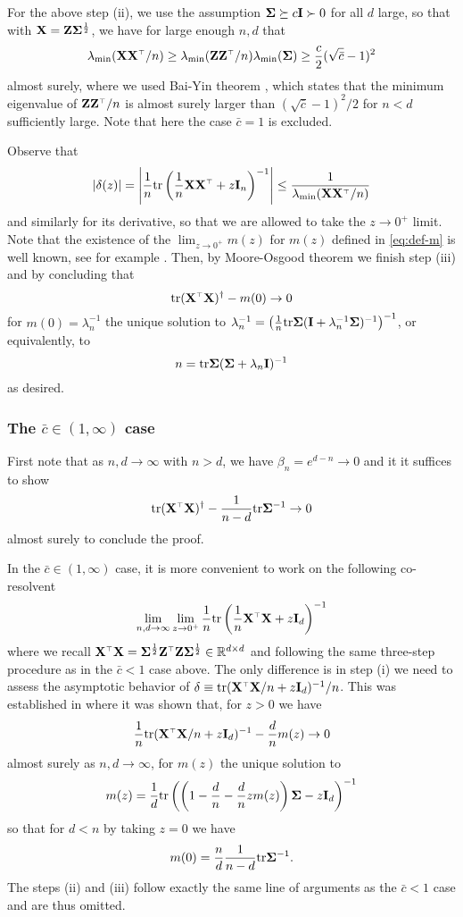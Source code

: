 For the above step (ii), we use the assumption $\mathbf{\Sigma} \succeq c \mathbf I \succ 0$
for all $d$ large, so that with $\mathbf X = \mathbf Z \mathbf{\Sigma}^{\frac12}$, we have for large enough $n,d$ that
\[
  \lambda_{\min} (\X \X^\top/n) \ge \lambda_{\min} (\Z \Z^\top/n) \lambda_{\min} (\Sigmab) \ge \frac{c}2 (\sqrt{\bar c} - 1 )^2
\]
almost surely, where we used Bai-Yin theorem \cite{bai1993limit}, which states that the minimum eigenvalue of $\Z \Z^\top/n$ is almost surely larger than $( \sqrt{\bar c} - 1 )^2/2$ for $n<d$ sufficiently large. Note that here the case $\bar c = 1$ is excluded.

Observe that
\[
  |\delta(z)| = \left| \frac1n \tr \left( \frac1n \X \X^\top  + z \I_n \right)^{-1} \right| \le \frac1{ \lambda_{\min} (\X \X^\top/n) }
\]
and similarly for its derivative, so that we are allowed to take the $z \to 0^+$ limit. Note that the existence of the $\lim_{z \to 0^+} m(z)$ for $m(z)$ defined in \eqref{eq:def-m} is well known, see for example \cite{ledoit2011eigenvectors}. Then, by Moore-Osgood theorem we finish step (iii) and by concluding that
\[
  \tr (\X^\top \X)^\dagger - m(0) \to 0
\]
for $m(0) = \lambda_n^{-1}$ the unique solution to $\lambda_n^{-1} = \left( \frac1n \mathrm{tr} \mathbf{\Sigma} (\mathbf I + \lambda_n^{-1} \mathbf{\Sigma})^{-1} \right)^{-1}$, or equivalently, to
\[
  n = \mathrm{tr} \mathbf{\Sigma} (\mathbf{\Sigma} + \lambda_n \mathbf I)^{-1}
\]
as desired.

\subsubsection{The $\bar c \in (1, \infty)$ case}

First note that as $n, d \to \infty$ with $n > d$, we have $\beta_n = e^{d-n} \to 0$ and it
it suffices to show
\[
  \tr (\X^\top \X)^\dagger - \frac1{n-d} \tr \Sigmab^{-1} \to 0
\]
almost surely to conclude the proof.

In the $\bar c \in (1, \infty)$ case, it is more convenient to work on the following co-resolvent
\[
  \lim_{n,d \to \infty} \lim_{z \to 0^+} \frac1n \tr \left( \frac1n \X^\top \X + z \I_d \right)^{-1}
\]
where we recall $\X^\top \X = \Sigmab^{\frac12} \Z^\top \Z \Sigmab^{\frac12} \in \R^{d \times d}$ and following the same three-step procedure as in the $\bar c < 1$ case above. The only difference is in step (i) we need to assess the asymptotic behavior of $\delta \equiv \tr (\X^\top \X/n + z \I_d)^{-1}/n$. This was established in \cite{bai1998no} where it was shown that, for $z > 0$ we have
\[
  \frac1n \tr (\X^\top \X/n + z \I_d)^{-1} - \frac{d}n m(z) \to 0
\]
almost surely as $n,d \to \infty$, for $m(z)$ the unique solution to
\[
  m(z) = \frac1d \mathrm{tr} \left( \left(1- \frac{d}n - \frac{d}n z m(z) \right) \mathbf{\Sigma} - z \mathbf I_d \right)^{-1}
\]
so that for $d < n$ by taking $z = 0$ we have
\[
  m(0) = \frac{n}d \frac1{n-d} \mathrm{tr} \mathbf{\Sigma}^{-1}.
\]
The steps (ii) and (iii) follow exactly the same line of arguments as the $\bar c < 1$ case and are thus omitted.



